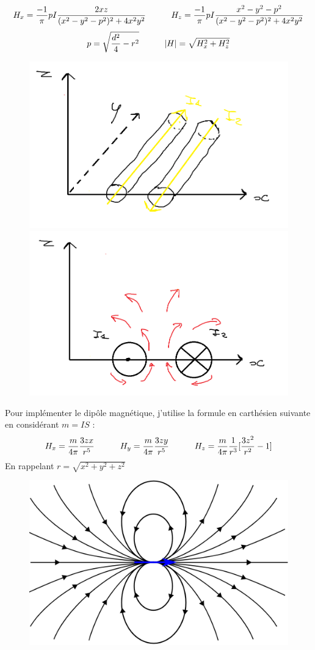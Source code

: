 \documentclass{article}
\begin{document}
\begin{equation}
H_{x}=\frac{-1}{\pi}pI\frac{2xz}{(x^2-y^2-p^2)^2+4x^2y^2} \indent\indent  H_{z}=\frac{-1}{\pi}pI\frac{x^2-y^2-p^2}{(x^2-y^2-p^2)^2+4x^2y^2}
\label{eq09}
\end{equation}
\begin{equation}
p = \sqrt{\frac{d^2}{4} - r^2} \indent\indent |H| = \sqrt{H_{x}^2+H_{z}^2}
\label{eq10}
\end{equation}
\begin{figure}[h]
	\centering
    \includegraphics[width=.4\linewidth]{Fils.png}
    \includegraphics[width=.4\linewidth]{Fils2.png}
\end{figure}

Pour implémenter le dipôle magnétique, j'utilise la formule en carthésien suivante en considérant $m = IS$ :
\begin{equation}
H_{x} = \frac{m}{4\pi}\frac{3zx}{r^5}\indent\indent H_{y} = \frac{m}{4\pi}\frac{3zy}{r^5}\indent\indent H_{z}=\frac{m}{4\pi}\frac{1}{r^3}[\frac{3z^2}{r^2} - 1]
\end{equation}
En rappelant \textbf{$r = \sqrt{x^2 + y^2 +z^2}$}
\begin{figure}[h]
	\centering
    \includegraphics[width=.5\linewidth]{Dipole.png}
    
\end{figure}
\end{document}

